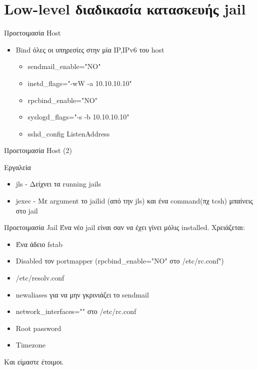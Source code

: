 \documentclass{beamer}
\begin{document}
\section{Low-level διαδικασία κατασκευής jail}

    \begin{frame}{Προετοιμασία Host}
    \begin{itemize}
        \item Bind όλες οι υπηρεσίες στην μία IP,IPv6 του host
        \begin{itemize}
        \item sendmail\_enable="NO"
        \item inetd\_flags="-wW -a 10.10.10.10"
        \item rpcbind\_enable="NO"
        \item syslogd\_flags="-s -b 10.10.10.10"
        \item sshd\_config ListenAddress
        \end{itemize}
    \end{itemize}
    \end{frame}

    \begin{frame}{Προετοιμασία Host (2)}
        
    Εργαλεία
    \begin{itemize}
        \item jls - Δείχνει τα running jails
        \item jexec - Με argument το jailid (από την jls) και ένα command(πχ tcsh) μπαίνεις στο jail
    \end{itemize}
    \end{frame}

    \begin{frame}{Προετοιμασία Jail}
    Ένα νέο jail είναι σαν να έχει γίνει μόλις installed. Χρειάζεται:
    \begin{itemize}
        \item Ένα άδειο fstab
        \item Disabled τον portmapper (rpcbind\_enable="NO" στο /etc/rc.conf")
        \item /etc/resolv.conf
        \item newaliases για να μην γκρινιάζει το sendmail
        \item network\_interfaces="" στο /etc/rc.conf
        \item Root password
        \item Timezone
    \end{itemize}
    Και είμαστε έτοιμοι.
    \end{frame}
\end{document}
